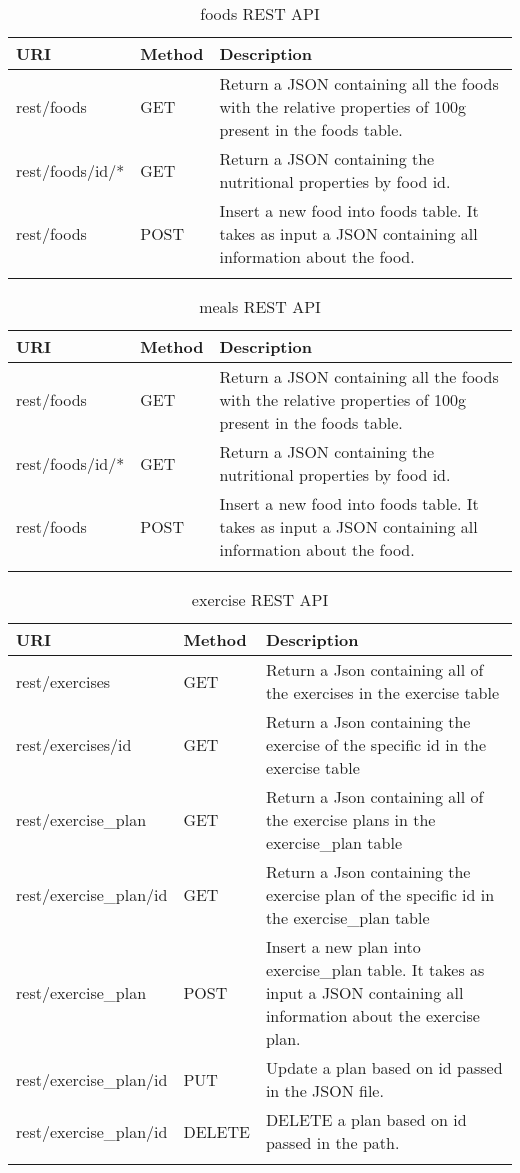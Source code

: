\begin{longtable}{|p{}|p{} |p{}|} 
\hline
\textbf{URI} & \textbf{Method} & \textbf{Description} \\\hline

rest/foods & GET & Return a JSON containing all the foods with the relative properties of 100g present in the foods table.\\\hline
rest/foods/id/* & GET & Return a JSON containing the nutritional properties by food id.\\\hline
rest/foods & POST & Insert a new food into foods table. It takes as input a JSON containing all information about the food.\\\hline
\caption{foods REST API}
\label{tab:termGlossary}
\end{longtable}

\begin{longtable}{|p{}|p{} |p{}|} 
\hline
\textbf{URI} & \textbf{Method} & \textbf{Description} \\\hline

rest/foods & GET & Return a JSON containing all the foods with the relative properties of 100g present in the foods table.\\\hline
rest/foods/id/* & GET & Return a JSON containing the nutritional properties by food id.\\\hline
rest/foods & POST & Insert a new food into foods table. It takes as input a JSON containing all information about the food.\\\hline
\caption{meals REST API}
\label{tab:termGlossary}
\end{longtable}

\begin{longtable}{|p{}|p{} |p{}|} 
\hline
\textbf{URI} & \textbf{Method} & \textbf{Description} \\\hline
rest/exercises & GET & Return a Json containing all of the exercises in the exercise table \\\hline rest/exercises/{id} & GET & Return a Json containing the exercise of the specific id in the exercise table \\\hline rest/exercise\_plan & GET & Return a Json containing all of the exercise plans in the exercise\_plan table \\\hline rest/exercise\_plan/{id} & GET & Return a Json containing the exercise plan of the specific id in the exercise\_plan table \\\hline rest/exercise\_plan & POST & Insert a new plan into exercise\_plan table. It takes as input a JSON containing all information about the exercise plan.\\\hline rest/exercise\_plan/id & PUT & Update a plan based on id passed in the JSON file.\\\hline rest/exercise\_plan/id & DELETE & DELETE a plan based on id passed in the path.\\\hline 
\caption{exercise REST API}
\label{tab:termGlossary}
\end{longtable}